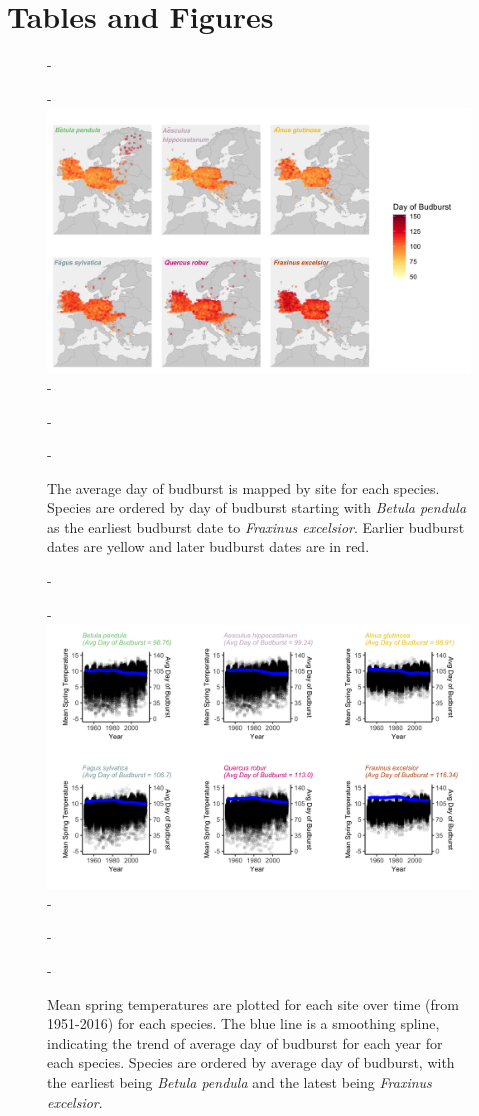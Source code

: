 \documentclass{article}\usepackage[]{graphicx}\usepackage[]{color}
\begin{document}


\section*{Tables and Figures} 

{\begin{figure} [H]
  -\begin{center}
  -\includegraphics[width=14cm]{..//analyses/figures/BB_base.png}
  -\caption{The average day of budburst is mapped by site for each species. Species are ordered by day of budburst starting with \textit{Betula pendula} as the earliest budburst date to \textit{Fraxinus excelsior}. Earlier budburst dates are yellow and later budburst dates are in red. }\label{fig:bbmap}
  -\end{center}
  -\end{figure}}
  
{\begin{figure} [H]
  -\begin{center}
  -\includegraphics[width=16cm]{..//analyses/figures/MSTBB_bySpp.png}
  -\caption{Mean spring temperatures are plotted for each site over time (from 1951-2016) for each species. The blue line is a smoothing spline, indicating the trend of average day of budburst for each year for each species. Species are ordered by average day of budburst, with the earliest being \textit{Betula pendula} and the latest being \textit{Fraxinus excelsior}. }\label{fig:mst}
  -\end{center}
  -\end{figure}}
  
\end{document}
